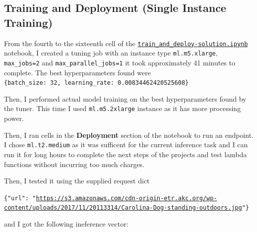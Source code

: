 \documentclass[a4paper
]{article}
\begin{document}
\newpage
\hypertarget{training-and-deployment-single-instance-training}{%
\subsection{Training and Deployment (Single Instance
Training)}\label{training-and-deployment-single-instance-training}}

From the fourth to the sixteenth cell of the
\href{https://github.com/FadyMorris/udacity-AWS-ml-engineer-nanodegree/tree/main/projects/04_operationalizing-an-aws-ml-project/train_and_deploy-solution.ipynb}{\texttt{train\_and\_deploy-solution.ipynb}}
notebook, I created a tuning job with an instance
type \texttt{ml.m5.xlarge}, \texttt{max\_jobs=2} and
\texttt{max\_parallel\_jobs=1} it took approximately 41 minutes to
complete. The best hyperparameters found were
\texttt{\{\textquotesingle{}batch\_size\textquotesingle{}:\ 32,\ \textquotesingle{}learning\_rate\textquotesingle{}:\ \textquotesingle{}0.00834462420525608\textquotesingle{}\}}

Then, I performed actual model training on the best hyperparameters
found by the tuner. This time I used \texttt{ml.m5.2xlarge} instance as
it has more processing power.

Then, I ran cells in the \textbf{Deployment} section of the notebook to
run an endpoint. I chose \texttt{ml.t2.medium} as it was sufficent for
the current inference task and I can run it for long hours to complete
the next steps of the projects and test lambda functions without
incurring too much charges.

Then, I tested it using the supplied request dict

\texttt{\{"url": "\url{https://s3.amazonaws.com/cdn-origin-etr.akc.org/wp-content/uploads/2017/11/20113314/Carolina-Dog-standing-outdoors.jpg}"\}}

and I got the following ineference vector:
\end{document}
